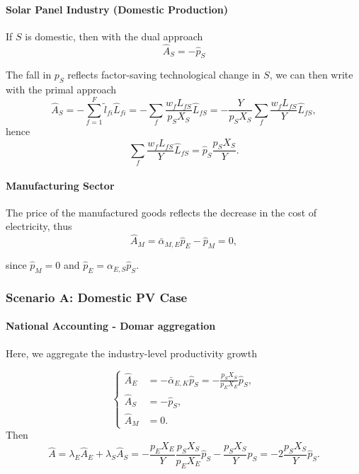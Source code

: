 \documentclass[11pt]{article}
\begin{document}
\paragraph{Solar Panel Industry (Domestic Production)}
If $S$ is domestic, then with the dual approach
\begin{equation}
    \hat{A}_S=-\hat{p}_S
\end{equation}

The fall in $p_S$ reflects factor-saving technological change in $S$, we can then write with the primal approach
\begin{equation*}
\hat{A}_S=-\sum_{f=1}^F \tilde{l}_{fi}\hat{L}_{fi}=-\sum_{f} \frac{w_fL_{fS}}{p_SX_S}\hat{L}_{fS}=-\frac{Y}{p_SX_S}\sum_{f} \frac{w_fL_{fS}}{Y}\hat{L}_{fS},
\end{equation*}
hence
\begin{equation}
\label{eq_factors_solarPV}
\sum_{f} \frac{w_fL_{fS}}{Y}\hat{L}_{fS}=\hat{p}_S\frac{p_SX_S}{Y}.
\end{equation}

\paragraph{Manufacturing Sector}
The price of the manufactured goods reflects the decrease in the cost of electricity, thus
\begin{equation*}
    \hat{A}_M=\bar{\alpha}_{M,E}\hat{p}_E-\hat{p}_M=0,
\end{equation*}

since $\hat{p}_M=0$ and $\hat{p}_E=\alpha_{E,S}\hat{p}_S$.

\subsubsection{Scenario A: Domestic PV Case}
\label{section_domestic_PV}

\paragraph{National Accounting - Domar aggregation} Here, we aggregate the industry-level productivity growth 

\begin{equation*}
    \begin{cases}
\hat{A}_E&=-\bar{\alpha}_{E,K}\hat{p}_S=-\frac{p_SX_S}{p_EX_E}\hat{p}_S,\\
\hat{A}_S&=-\hat{p}_S,\\
\hat{A}_M&=0.
\end{cases}
\end{equation*}
Then
\[
\hat{A}=\lambda_E\hat{A}_E+\lambda_S\hat{A}_S
=-\frac{p_EX_E}{Y}\frac{p_SX_S}{p_EX_E}\hat{p}_S-\frac{p_SX_S}{Y}\hat{p}_S
=-2\frac{p_SX_S}{Y}\hat{p}_S.
\]
\end{document}
